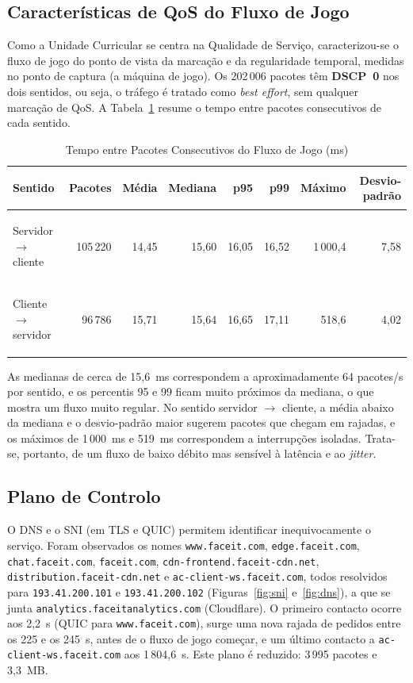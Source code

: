 \documentclass[11pt,a4paper]{article}
\begin{document}
\subsection{Características de QoS do Fluxo de Jogo}
Como a Unidade Curricular se centra na Qualidade de Serviço, caracterizou-se o fluxo de jogo do ponto de vista da marcação e
da regularidade temporal, medidas no ponto de captura (a máquina de jogo). Os 202\,006 pacotes têm \textbf{DSCP~0} nos dois
sentidos, ou seja, o tráfego é tratado como \emph{best effort}, sem qualquer marcação de QoS. A Tabela~\ref{tab:qos} resume o
tempo entre pacotes consecutivos de cada sentido.

\begin{table}[htbp]
\centering
\caption{Tempo entre Pacotes Consecutivos do Fluxo de Jogo (ms)}\label{tab:qos}
\begin{tabularx}{\linewidth}{@{}>{\bfseries\raggedright\arraybackslash}Xrrrrrrr@{}}
\toprule
\textbf{Sentido} & \textbf{Pacotes} & \textbf{Média} & \textbf{Mediana} & \textbf{p95} & \textbf{p99} & \textbf{Máximo} & \textbf{Desvio-padrão}\\
\midrule
Servidor $\rightarrow$ cliente & 105\,220 & 14,45 & 15,60 & 16,05 & 16,52 & 1\,000,4 & 7,58\\
Cliente $\rightarrow$ servidor &  96\,786 & 15,71 & 15,64 & 16,65 & 17,11 &   518,6 & 4,02\\
\bottomrule
\end{tabularx}
\end{table}

As medianas de cerca de 15,6~ms correspondem a aproximadamente 64 pacotes/s por sentido, e os percentis 95 e 99 ficam muito
próximos da mediana, o que mostra um fluxo muito regular. No sentido servidor $\rightarrow$ cliente, a média abaixo da mediana
e o desvio-padrão maior sugerem pacotes que chegam em rajadas, e os máximos de 1\,000~ms e 519~ms correspondem a interrupções
isoladas. Trata-se, portanto, de um fluxo de baixo débito mas sensível à latência e ao \emph{jitter}.

\subsection{Plano de Controlo}
O DNS e o SNI (em TLS e QUIC) permitem identificar inequivocamente o serviço. Foram observados os nomes
\nolinkurl{www.faceit.com}, \nolinkurl{edge.faceit.com}, \nolinkurl{chat.faceit.com}, \nolinkurl{faceit.com},
\nolinkurl{cdn-frontend.faceit-cdn.net}, \nolinkurl{distribution.faceit-cdn.net} e \nolinkurl{ac-client-ws.faceit.com}, todos
resolvidos para \texttt{193.41.200.101} e \texttt{193.41.200.102} (Figuras~\ref{fig:sni} e~\ref{fig:dns}), a que se junta
\nolinkurl{analytics.faceitanalytics.com} (Cloudflare). O primeiro contacto ocorre aos 2,2~s (QUIC para
\nolinkurl{www.faceit.com}), surge uma nova rajada de pedidos entre os 225 e os 245~s, antes de o fluxo de jogo começar, e um
último contacto a \nolinkurl{ac-client-ws.faceit.com} aos 1\,804,6~s. Este plano é reduzido: 3\,995 pacotes e 3,3~MB.
\end{document}

